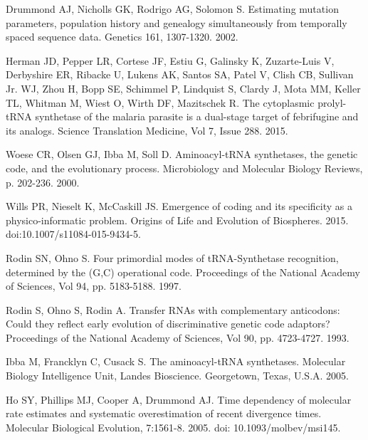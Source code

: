 \documentclass[10pt,letterpaper]{article}
\begin{document}
\begin{thebibliography}{10}
Drummond AJ, Nicholls GK, Rodrigo AG, Solomon S. 
\newblock Estimating mutation parameters, population history and genealogy simultaneously from temporally spaced sequence data.
\newblock Genetics 161, 1307-1320. 2002.

Herman JD, Pepper LR, Cortese JF, Estiu G, Galinsky K, Zuzarte-Luis V, Derbyshire ER, Ribacke U, Lukens AK, Santos SA, Patel V, Clish CB, Sullivan Jr. WJ, Zhou H,
Bopp SE, Schimmel P, Lindquist S, Clardy J, Mota MM, Keller TL, Whitman M, Wiest O, Wirth DF, Mazitschek R. 
\newblock The cytoplasmic prolyl-tRNA synthetase of the malaria parasite is a dual-stage target of febrifugine and its analogs.
\newblock Science Translation Medicine, Vol 7, Issue 288. 2015.

Woese CR, Olsen GJ, Ibba M, Soll D.
\newblock Aminoacyl-tRNA synthetases, the genetic code, and the evolutionary process.
\newblock Microbiology and Molecular Biology Reviews, p. 202-236. 2000.

Wills PR, Nieselt K, McCaskill JS.
\newblock Emergence of coding and its specificity as a physico-informatic problem.
\newblock Origins of Life and Evolution of Biospheres. 2015. doi:10.1007/s11084-015-9434-5.

Rodin SN, Ohno S.
\newblock Four primordial modes of tRNA-Synthetase recognition, determined by the (G,C) operational code.
\newblock Proceedings of the National Academy of Sciences, Vol 94, pp. 5183-5188. 1997.

Rodin S, Ohno S, Rodin A.
\newblock Transfer RNAs with complementary anticodons: Could they reflect early evolution of discriminative genetic code adaptors?
\newblock Proceedings of the National Academy of Sciences, Vol 90, pp. 4723-4727. 1993.

Ibba M, Francklyn C, Cusack S.
\newblock The aminoacyl-tRNA synthetases.
\newblock Molecular Biology Intelligence Unit, Landes Bioscience. Georgetown, Texas, U.S.A. 2005.

Ho SY, Phillips MJ, Cooper A, Drummond AJ.
\newblock Time dependency of molecular rate estimates and systematic overestimation of recent divergence times.
\newblock Molecular Biological Evolution, 7:1561-8. 2005. doi: 10.1093/molbev/msi145.


\end{thebibliography}
\end{document}
